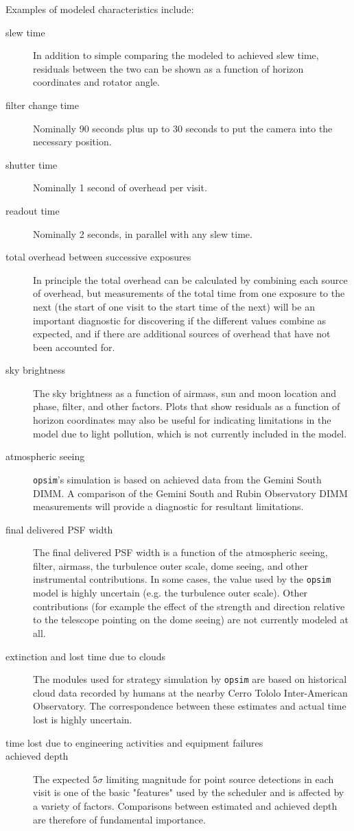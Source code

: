 Examples of modeled characteristics include:
\begin{description}
\item[{slew time}] In addition to simple comparing the modeled to achieved slew time, residuals between the two can be shown as a function of horizon coordinates and rotator angle.
\item[{filter change time}] Nominally 90 seconds plus up to 30 seconds to put the camera into the necessary position.
\item[{shutter time}] Nominally 1 second of overhead per visit.
\item[{readout time}] Nominally 2 seconds, in parallel with any slew time.
\item[{total overhead between successive exposures}] In principle the total overhead can be calculated by combining each source of overhead, but measurements of the total time from one exposure to the next (the start of one visit to the start time of the next) will be an important diagnostic for discovering if the different values combine as expected, and if there are additional sources of overhead that have not been accounted for.
\item[{sky brightness}] The sky brightness as a function of airmass, sun and moon location and phase, filter, and other factors. Plots that show residuals as a function of horizon coordinates may also be useful for indicating limitations in the model due to light pollution, which is not currently included in the model.
\item[{atmospheric seeing}] \texttt{opsim}'s simulation is based on achieved data from the Gemini South DIMM. A comparison of the Gemini South and Rubin Observatory DIMM measurements will provide a diagnostic for resultant limitations.
\item[{final delivered PSF width}] The final delivered PSF width is a function of the atmospheric seeing, filter, airmass, the turbulence outer scale, dome seeing, and other instrumental contributions. In some cases, the value used by the \texttt{opsim} model is highly uncertain (e.g. the turbulence outer scale). Other contributions (for example the effect of the strength and direction relative to the telescope pointing on the dome seeing) are not currently modeled at all.
\item[{extinction and lost time due to clouds}] The modules used for strategy simulation by \texttt{opsim} are based on historical cloud data recorded by humans at the nearby Cerro Tololo Inter-American Observatory. The correspondence between these estimates and actual time lost is highly uncertain.
\item[{time lost due to engineering activities and equipment failures}] 

\item[{achieved depth}] The expected \(5 \sigma\) limiting magnitude for point source detections in each visit is one of the basic "features" used by the scheduler and is affected by a variety of factors. Comparisons between estimated and achieved depth are therefore of fundamental importance.
\end{description}

